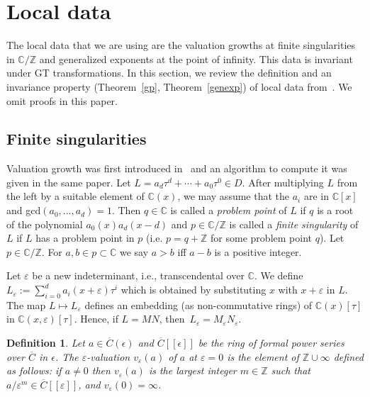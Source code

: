 \documentclass{article}
\newtheorem{definition}[theorem]{Definition}
\newcommand{\Z}{{\mathbb{Z}}} \newcommand{\Q}{{\mathbb{Q}}}
\newcommand{\C}{{\mathbb{C}}} \newcommand{\N}{{\mathbb{N}}}
\begin{document}
\section{Local data}\label{sec:ld}

The local data that we are using are the valuation growths at finite singularities in
$\C/\Z$ and generalized exponents at the point of infinity.  This data is invariant under
GT transformations.  In this section, we review the definition and an invariance
property (Theorem~\ref{gp}, Theorem~\ref{genexp}) of local data from~\cite{YC11, CH09,
  CHG10, HO99}. We omit proofs in this paper.


\subsection{Finite singularities}
Valuation growth was first introduced in~\cite{HO99} and an algorithm to compute it was
given in the same paper. Let $L=a_d\tau^d+\cdots+a_0\tau^0 \in D$. After multiplying
$L$ from the left by a suitable element of $\C(x)$, we may assume that the
$a_i$ are in $\C[x]$ and gcd$(a_0,\ldots,a_d)=1$. Then $q \in \C$ is called a {\em
   problem point} of $L$ if $q$ is a root of the polynomial $a_0(x)a_d(x-d)$ and $p \in
 \C/ \Z$ is called a {\em finite singularity} of $L$ if $L$ has a problem point in $p$
 (i.e. $p=q+\Z$ for some problem point $q$).  Let $p \in \C/\Z$.  For $a,b \in p \subset
 \C$ we say $a > b$ iff $a-b$ is a positive integer.

 Let $\varepsilon$ be a new indeterminant, i.e., transcendental over $\C$.  We define
 $L_\varepsilon:=\sum_{i=0}^d a_i(x+\varepsilon)\tau^i$ which is obtained by substituting
 $x$ with $x+\varepsilon$ in $L$. The map $L \mapsto L_\varepsilon$ defines an embedding
 (as non-commutative rings) of $\C(x)[\tau]$ in $\C(x,\varepsilon)[\tau]$. Hence, if
 $L=MN$, then~$L_\varepsilon=M_\varepsilon N_\varepsilon$.





\begin{definition} Let $a \in \overline{C}(\epsilon)$ and $\overline{C}[[\epsilon]]$ be the ring of 
formal power series over $\overline{C}$ in $\epsilon$. The $\varepsilon$-valuation
  $v_\varepsilon(a)$ of $a$ at $\varepsilon=0$ is the element of $\Z \cup {\infty}$
  defined as follows: if $a\neq0$ then $v_\varepsilon(a)$ is the largest integer $m \in
  \Z$ such that $a/\varepsilon^m \in \overline{C}[[\varepsilon]]$, and
  $v_\varepsilon(0)=\infty$. \end{definition}
\end{document}

